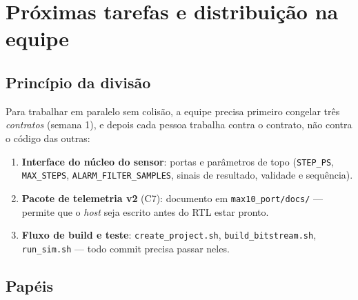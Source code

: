 \documentclass[11pt,a4paper]{article}
\newcommand{\file}[1]{\texttt{\small #1}}
\begin{document}
\section{Próximas tarefas e distribuição na equipe}
\label{sec:tarefas}

\subsection{Princípio da divisão}
Para trabalhar em paralelo sem colisão, a equipe precisa primeiro congelar três
\emph{contratos} (semana 1), e depois cada pessoa trabalha contra o contrato, não contra o
código das outras:
\begin{enumerate}
  \item \textbf{Interface do núcleo do sensor}: portas e parâmetros de topo
        (\texttt{STEP\_PS}, \texttt{MAX\_STEPS}, \texttt{ALARM\_FILTER\_SAMPLES}, sinais de
        resultado, validade e sequência).
  \item \textbf{Pacote de telemetria v2} (C7): documento em \file{max10\_port/docs/} --- permite
        que o \emph{host} seja escrito antes do RTL estar pronto.
  \item \textbf{Fluxo de build e teste}: \texttt{create\_project.sh}, \texttt{build\_bitstream.sh},
        \texttt{run\_sim.sh} --- todo commit precisa passar neles.
\end{enumerate}

\subsection{Papéis}
\end{document}
